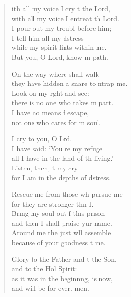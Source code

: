 \settowidth{\versewidth}{With all my voice I cry to the Lord, *}
\begin{verse}%
  \begin{patverse}
ith all my voice I cry t the Lord,\Med\\
    with all my voice I entreat th Lord.\\
I pour out my troubl before him;\Med\\
    I tell him all my d\pointup{\i}stress\\
while my spirit fints within me.\Med\\
    But you, O Lord, know m path.

On the way where  shall walk\Med\\
    they have hidden a snare to ntrap me.\\
Look on my r\pointup{\i}ght and see:\Med\\
    there is no one who takes m part.\\
I have no means f escape,\Med\\
    not one who cares for m soul.

I cry to you, O Lrd.\Flex\\
    I have said: ‘You re my refuge\Med\\
    all I have in the land of th living.’\\
Listen, then, t my cry\Med\\
    for I am in the depths of d\pointup{\i}stress.

Rescue me from those wh pursue me\Med\\
    for they are stronger thn I.\\
Bring my soul out f this prison\Med\\
    and then I shall praise yur name.\\
Around me the just w\pointup{\i}ll assemble\Med\\
    because of your goodness t me.

Glory to the Father and t the Son,\Med\\
    and to the Hol Spirit:\\
as it was in the beginn\pointup{\i}ng, is now,\Med\\
    and will be for ever. men.
  \end{patverse}
\end{verse}
